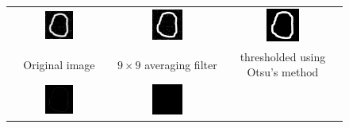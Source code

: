 \documentclass[11pt,a4paper]{article}
\begin{document}
\begin{figure}[!b]
	\centering
	\begin{tabular}{ccc} 
		\includegraphics[width=0.3\textwidth]{pro10/chaincode/11_5_a}&
		\includegraphics[width=0.3\textwidth]{pro10/chaincode/11_5_b}&
		\includegraphics[width=0.3\textwidth]{pro10/chaincode/11_5_c}\\
		 Original image & $9\times 9$ averaging filter  & thresholded using Otsu's method\\
		\includegraphics[width=0.3\textwidth]{pro10/chaincode/11_5_d}&
		\includegraphics[width=0.3\textwidth]{pro10/chaincode/11_5_e}&

\end{tabular}
\end{figure}
\end{document}
